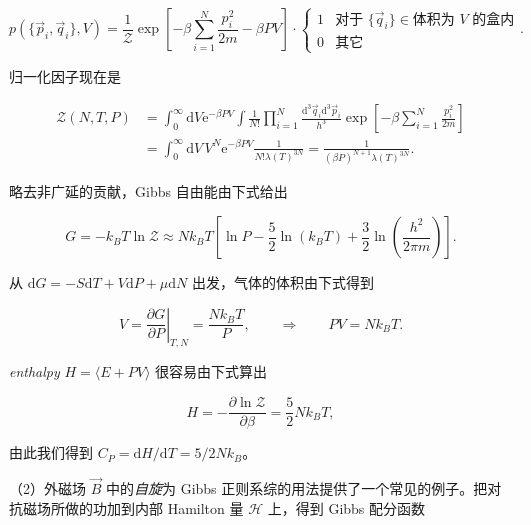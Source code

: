 \begin{equation}\label{eq:4.90}
  p(\{\vec p_i,\vec q_i\},V)=\frac{1}{\mathcal{Z}}\exp\left[-\beta\sum_{i=1}^N\frac{p_i^2}{2m}-\beta PV\right]\cdot
  \begin{cases}1 & \text{对于 }\{\vec q_i\}\in\text{体积为 }V\text{ 的盒内}\\ 0 & \text{其它}\end{cases}.
\end{equation}

归一化因子现在是

\begin{equation}\label{eq:4.91}
  \begin{aligned}
    \mathcal{Z}(N,T,P)&=\int_0^\infty\mathrm{d}V\mathrm{e}^{-\beta PV}\int\frac{1}{N!}\prod_{i=1}^N\frac{\mathrm{d}^3\vec q_i\mathrm{d}^3\vec p_i}{h^3}\exp\left[-\beta\sum_{i=1}^N\frac{p_i^2}{2m}\right]\\
    &=\int_0^\infty\mathrm{d}V\,V^N\mathrm{e}^{-\beta PV}\frac{1}{N!\lambda(T)^{3N}}=\frac{1}{(\beta P)^{N+1}\lambda(T)^{3N}}.
  \end{aligned}
\end{equation}

略去非广延的贡献，Gibbs 自由能由下式给出

\begin{equation}\label{eq:4.92}
  G=-k_BT\ln\mathcal{Z}\approx Nk_BT\left[\ln P-\frac{5}{2}\ln(k_BT)+\frac{3}{2}\ln\left(\frac{h^2}{2\pi m}\right)\right].
\end{equation}

从 $\mathrm{d}G=-S\mathrm{d}T+V\mathrm{d}P+\mu\mathrm{d}N$ 出发，气体的体积由下式得到

\begin{equation}\label{eq:4.93}
  V=\left.\frac{\partial G}{\partial P}\right|_{T,N}=\frac{Nk_BT}{P},\qquad\Longrightarrow\qquad PV=Nk_BT.
\end{equation}


\textit{enthalpy} $H=\langle E+PV\rangle$ 很容易由下式算出

\begin{equation*}
  H=-\frac{\partial\ln\mathcal{Z}}{\partial\beta}=\frac{5}{2}Nk_BT,
\end{equation*}

由此我们得到 $C_P=\mathrm{d}H/\mathrm{d}T=5/2Nk_B$。

（2）外磁场 $\vec B$ 中的\emph{自旋}为 Gibbs 正则系综的用法提供了一个常见的例子。把对抗磁场所做的功加到内部 Hamilton 量 $\mathscr H$ 上，得到 Gibbs 配分函数

